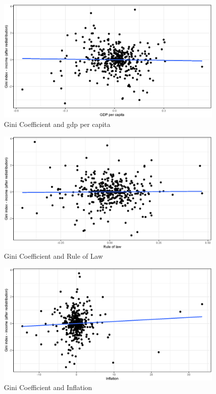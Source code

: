 \documentclass[a4paper,11pt]{article}
\begin{document}
\begin{figure}
    \caption{Gini Coefficient and \ac{gdp} per capita}
\includegraphics[width=\textwidth, keepaspectratio]{figures/GDPGiniNet_dm}
\end{figure}

\begin{figure}
    \caption{Gini Coefficient and Rule of Law}
\includegraphics[width=\textwidth, keepaspectratio]{figures/RuleLawGiniNet_dm}
\end{figure}

\begin{figure}
    \caption{Gini Coefficient and Inflation}
\includegraphics[width=\textwidth, keepaspectratio]{figures/InflGiniNet_dm}
\end{figure}
\end{document}
